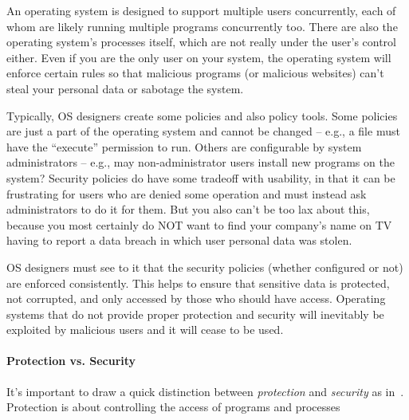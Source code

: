 An operating system is designed to support multiple users concurrently, each of whom are likely running multiple programs concurrently too. There are also the operating system's processes itself, which are not really under the user's control either. Even if you are the only user on your system, the operating system will enforce certain rules so that malicious programs (or malicious websites) can't steal your personal data or sabotage the system. 

Typically, OS designers create some policies and also policy tools. Some policies are just a part of the operating system and cannot be changed -- e.g., a file must have the ``execute'' permission to run. Others are configurable by system administrators -- e.g., may non-administrator users install new programs on the system? Security policies do have some tradeoff with usability, in that it can be frustrating for users who are denied some operation and must instead ask administrators to do it for them. But you also can't be too lax about this, because you most certainly do NOT want to find your company's name on TV having to report a data breach in which user personal data was stolen.

OS designers must see to it that the security policies (whether configured or not) are enforced consistently. This helps to ensure that sensitive data is protected, not corrupted, and only accessed by those who should have access. Operating systems that do not provide proper protection and security will inevitably be exploited by malicious users and it will cease to be used. 

\paragraph{Protection vs. Security} It's important to draw a quick distinction between \textit{protection} and \textit{security} as in~\cite{osc}. Protection is about controlling the access of programs and processes 




